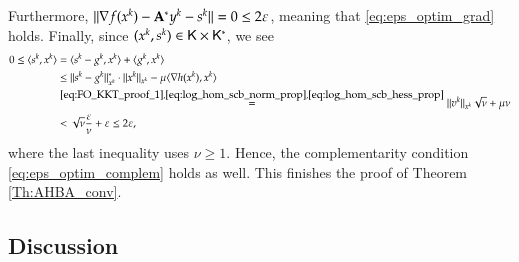 Furthermore, $\|\nabla f(x^{k})-{\mathbf A}^{\ast}y^{k} - s^{k}\|=0\leq 2 \varepsilon$, meaning that \eqref{eq:eps_optim_grad} holds. 
Finally, since $(x^{k},s^{k})\in\mathsf{K}\times\mathsf{K}^{\ast}$, we see 
\begin{align}
0 \leq \langle s^{k},x^{k}\rangle&=\langle s^{k}-g^{k},x^{k}\rangle+\langle g^{k},x^{k}\rangle \notag\\
&\leq \lVert s^{k}-g^{k}\rVert_{x^{k}}^{\ast}\cdot\lVert x^{k}\rVert_{x^{k}}-\mu\langle\nabla h(x^{k}),x^{k}\rangle \notag \\
&\stackrel{\eqref{eq:FO_KKT_proof_1},\eqref{eq:log_hom_scb_norm_prop},\eqref{eq:log_hom_scb_hess_prop}}{=}\lVert v^{k}\rVert_{x^{k}}\sqrt{\nu}+\mu\nu \notag \\
&<\sqrt{\nu}\frac{\varepsilon}{\nu}+\varepsilon\leq 2\varepsilon, \label{eq:FO_KKT_proof_3}
\end{align}
where the last inequality uses $\nu\geq 1$. Hence, the complementarity condition \eqref{eq:eps_optim_complem} holds as well. This finishes the proof of Theorem \ref{Th:AHBA_conv}.

\subsection{Discussion}
\label{sec:FO_discussion}
